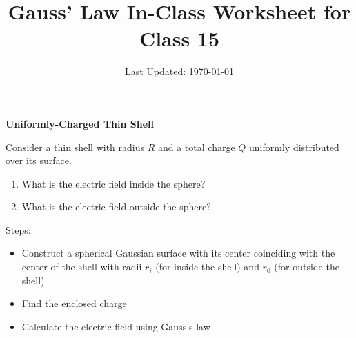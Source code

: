 \documentclass{../../oss-handout}
\title{Gauss' Law In-Class Worksheet for Class 15}
\author{}%
\date{Last Updated: \today}
\begin{document}
\thispagestyle{title}
\gentitle

\textbf{Uniformly-Charged Thin Shell}

\begin{minipage}{.43\linewidth}
\end{minipage}
\begin{minipage}{.55\linewidth}
  Consider a thin shell with radius $R$ and a total charge $Q$ uniformly
  distributed over its surface.
  
  \begin{enumerate}[nosep]
  \item What is the electric field inside the sphere?
  \item What is the electric field outside the sphere?
  \end{enumerate}
  
  \vspace{.2in}Steps:
  \begin{itemize}[nosep]
  \item Construct a spherical Gaussian surface with its center coinciding with
    the center of the shell with radii $r_i$ (for inside the shell) and $r_0$
    (for outside the shell)
  \item Find the enclosed charge
  \item Calculate the electric field using Gauss's law
  \end{itemize}
\end{minipage}
\vspace{\stretch1}
\begin{center}
\end{center}
\newpage
\end{document}
